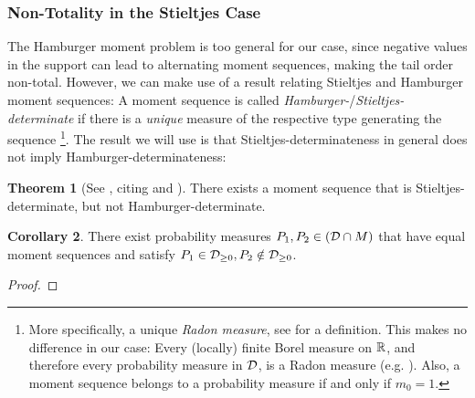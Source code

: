 \documentclass[a4paper,DIV=11,abstracton,twoside=semi]{scrreprt}
\theoremstyle{definition}
\newtheorem{thm}{Theorem}[chapter] %
\newtheorem{cor}[thm]{Corollary}
\begin{document}
    \subsubsection{Non-Totality in the Stieltjes Case}
    The Hamburger moment problem is too general for our case, since negative values in the support can lead to alternating moment sequences, making the tail order non-total.
    However, we can make use of a result relating Stieltjes and Hamburger moment sequences:
    A moment sequence is called \emph{Hamburger-}/\emph{Stieltjes-determinate} if there is a \emph{unique} measure of the respective type generating the sequence \cite[p.68]{bib:schmuedgenTheMomentProblem}
    \footnote{More specifically, a unique \emph{Radon measure}, see \cite[A.1]{bib:schmuedgenTheMomentProblem} for a definition. This makes no difference in our case: Every (locally) finite Borel measure on $\mathbb{R}$, and therefore every probability measure in $\mathcal{D}$, is a Radon measure (e.g. \cite[Proposition II.3.1]{bib:malliavinIntegrationAndProbability}). Also, a moment sequence belongs to a probability measure if and only if $m_0 = 1$.}.
    The result we will use is that Stieltjes-determinateness in general does not imply Hamburger-determinateness:
    
    \begin{thm}[See {\cite[Fact A]{bib:linMomentProblemRecentDevelopments}}, citing {\cite[p.240]{bib:akhiezerClassicalMomentProblem}} and \cite{bib:chiharaIndeterminateHamburgerMomentProblems}]
        There exists a moment sequence that is Stieltjes-determinate, but not Hamburger-determinate.
    \end{thm}

    \begin{cor}
        There exist probability measures $P_1, P_2 \in (\mathcal{D} \cap M)$ that have equal moment sequences and satisfy $P_1 \in \mathcal{D}_{\geq0}, P_2 \notin \mathcal{D}_{\geq0}$.
        \label{cor:equalMomentSequencesStieltjesHamburger}
    \end{cor}
    \begin{proof}
        \sloppypar{
        Let $(m_n)_{n \geq 0}$ be a moment sequence which is Stieltjes-determinate, but not Hamburger-determinate.
        Let $\mu_1$ be the unique measure in $\Dgeqzero$ with that moment sequence.
        Let $\mu_2 \neq \mu_1$ be a different measure with that moment sequence, which exists since the sequence is not Hamburger-determinate. 
        Since $\mu_1$ is unique in the Stieltjes sense, the support of $\mu_2$ must overlap with $(-\infty, 0)$.
        If $m_0 \neq 1$, the measures constructed are not probability measures: 
        We normalize them and define $P_1 = \frac{1}{m_0}\mu_1, P_2 = \frac{1}{m_0}\mu_2$, which are probability measures which both have the moment sequence $(\frac{m_n}{m_0})_{n \geq 0}$.
    }
    \end{proof}
    
\end{document}

